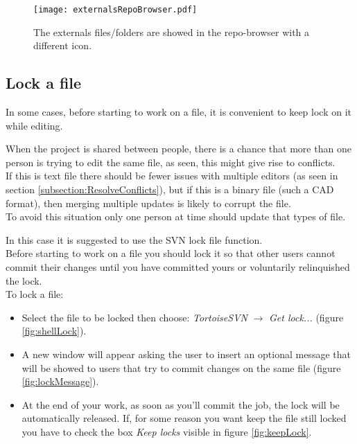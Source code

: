 \begin{figure}[htbp]
    \centering
    \texttt{[image: externalsRepoBrowser.pdf]}
    \caption{The externals files/folders are showed in the repo-browser with a different icon.}
    \label{fig:externalsRepoBrowser}
\end{figure}









\subsection{Lock a file}
\label{subsection:lockFile}

In some cases, before starting to work on a file, it is convenient to keep lock on it while editing.

When the project is shared between people, there is a chance that more than one person is trying to edit the same file, as seen, this might give rise to conflicts.\\

If this is text file there should be fewer issues with multiple editors (as seen in section \ref{subsection:ResolveConflicts}), but if this is a binary file (such a CAD format), then merging multiple updates is likely to corrupt the file.\\


To avoid this situation only one person at time should update that types of file.

In this case it is suggested to use the SVN lock file function.\\ 

Before starting to work on a file you should lock it so that other users cannot commit their changes until you have committed yours or voluntarily relinquished the lock.\\

To lock a file:

\begin{itemize}

    \item Select the file to be locked then choose: \textit{TortoiseSVN} $\rightarrow$ \textit{Get lock...} (figure \ref{fig:shellLock}).
    
    \item A new window will appear asking the user to insert an optional message that will be showed to users that try to commit changes on the same file (figure \ref{fig:lockMessage}).
    
    \item At the end of your work, as soon as you'll commit the job, the lock will be automatically released. If, for some reason you want keep the file still locked you have to check the box \textit{Keep locks} visible in figure \ref{fig:keepLock}.
    
\end{itemize}





